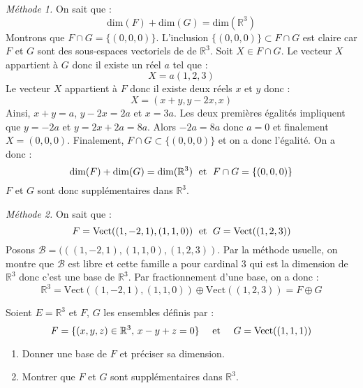 \documentclass[a4paper,10pt]{report}
\begin{document}
\medskip

\noindent \textit{Méthode 1.} On sait que :
$$ \textrm{dim}(F) + \textrm{dim}(G) = \textrm{dim}(\mathbb{R}^3)$$
Montrons que $F \cap G = \lbrace (0,0,0) \rbrace$. L'inclusion $ \lbrace (0,0,0) \rbrace \subset F \cap G$ est claire car $F$ et $G$ sont des sous-espaces vectoriels de de $\mathbb{R}^3$. Soit $X \in F \cap G$. Le vecteur $X$ appartient à $G$ donc il existe un réel $a$ tel que :
$$ X = a(1,2,3)$$
Le vecteur $X$ appartient à $F$ donc il existe deux réels $x$ et $y$ donc :
$$ X = (x+y,y-2x,x)$$
Ainsi, $x+y=a$, $y-2x=2a$ et $x=3a$. Les deux premières égalités impliquent que $y=-2a$ et $y=2x+2a=8a$. Alors $-2a=8a$ donc $a=0$ et finalement $X=(0,0,0)$. Finalement, $F \cap G \subset \lbrace (0,0,0) \rbrace$ et on a donc l'égalité. On a donc :
$$  \textrm{dim}(F) + \textrm{dim}(G) = \textrm{dim}(\mathbb{R}^3) \; \hbox{ et } \; F \cap G = \lbrace (0,0,0) \rbrace$$
$F$ et $G$ sont donc supplémentaires dans $\mathbb{R}^3$.

\medskip

\noindent \textit{Méthode 2.} On sait que :
$$ F=\textrm{Vect}((1,-2,1),(1,1,0)) \; \hbox{ et } \; G=\textrm{Vect}((1,2,3))$$
Posons $\mathcal{B}=(((1,-2,1),(1,1,0),(1,2,3))$. Par la méthode usuelle, on montre que $\mathcal{B}$ est libre et cette famille a pour cardinal $3$ qui est la dimension de $\mathbb{R}^3$ donc c'est une base de $\mathbb{R}^3$. Par fractionnement d'une base, on a donc :
$$ \mathbb{R}^3 =  \textrm{Vect}((1,-2,1),(1,1,0)) \oplus \textrm{Vect}((1,2,3)) = F \oplus G$$


\medskip

\begin{Exa} Soient $E= \mathbb{R}^3$ et $F$, $G$ les ensembles définis par :
$$ F = \lbrace (x,y,z) \in \mathbb{R}^3, \, x-y+z=0 \rbrace \quad \hbox{ et }  \quad G = \textrm{Vect}((1,1,1)) $$

\begin{enumerate}
\item Donner une base de $F$ et préciser sa dimension.
\item Montrer que $F$ et $G$ sont supplémentaires dans $\mathbb{R}^3$.
\end{enumerate}
\end{Exa}
\end{document}
